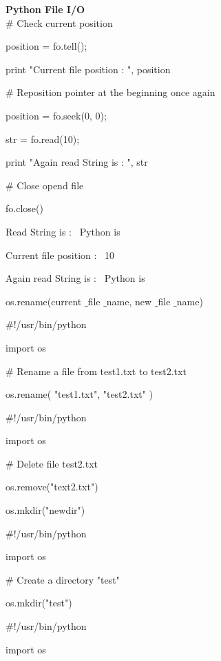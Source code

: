 \begin{center}{\fontsize{24pt}{24pt}\selectfont \textbf{Python File I/O} \\}
 $  \#  $ Check current position 
 
position = fo.tell(); 

print "Current file position : ", position 
\vspace{12pt}

 $  \#  $ Reposition pointer at the beginning once again 
 
position = fo.seek(0, 0); 

str = fo.read(10); 

print "Again read String is : ", str 

 $  \#  $ Close opend file 
 
fo.close() 
\vspace{14pt}

Read String is :~ Python is 

Current file position :~ 10 

Again read String is :~ Python is 
\vspace{14pt}

os.rename(current $  \_  $file $  \_  $name, new $  \_  $file $  \_  $name) 
\vspace{14pt}

 $  \#  $!/usr/bin/python 
 
import os 
\vspace{12pt}

 $  \#  $ Rename a file from test1.txt to test2.txt 
 
os.rename( "test1.txt", "test2.txt" ) 
\vspace{14pt}

 $  \#  $!/usr/bin/python 
 
import os 
\vspace{12pt}
 
 $  \#  $ Delete file test2.txt 
 
os.remove("text2.txt") 
\vspace{14pt}
 
os.mkdir("newdir") 
\vspace{14pt}

 $  \#  $!/usr/bin/python 
 
import os 
\vspace{12pt}

 $  \#  $ Create a directory "test" 
 
os.mkdir("test") 
\vspace{14pt}

 $  \#  $!/usr/bin/python 
 
import os 
\vspace{12pt}
 

\end{center}
